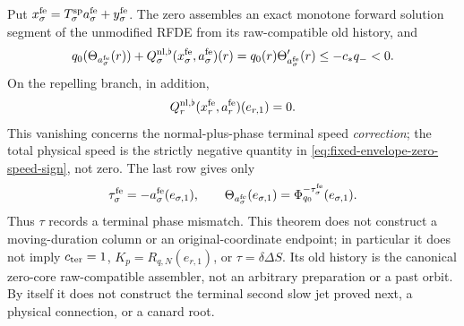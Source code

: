 \begin{theorem}
Put \(x_\sigma^{\rm fe}=T_\sigma^{\rm sp}a_\sigma^{\rm fe}
+y_\sigma^{\rm fe}\).  The zero assembles an exact monotone forward
solution segment of the unmodified RFDE from its raw-compatible old
history, and
\begin{equation}
 q_0(\Theta_{a_\sigma^{\rm fe}}(r))
 +Q_\sigma^{\rm nl,\flat}
       (x_\sigma^{\rm fe},a_\sigma^{\rm fe})(r)
 =q_0(r)\Theta_{a_\sigma^{\rm fe}}'(r)
 \le-c_*q_-<0.                                  \label{eq:fixed-envelope-zero-speed-sign}
\end{equation}
On the repelling branch, in addition,
\begin{equation}
 Q_r^{\rm nl,\flat}(x_r^{\rm fe},a_r^{\rm fe})(e_{r,1})=0.
                                                        \label{eq:fixed-envelope-terminal-speed-correction-zero}
\end{equation}
This vanishing concerns the normal-plus-phase terminal speed
\emph{correction}; the total physical speed is the strictly negative
quantity in \cref{eq:fixed-envelope-zero-speed-sign}, not zero.
The last row gives only
\begin{equation}
 \tau_\sigma^{\rm fe}=-a_\sigma^{\rm fe}(e_{\sigma,1}),
 \qquad
 \Theta_{a_\sigma^{\rm fe}}(e_{\sigma,1})
 =\Phi_{q_0}^{-\tau_\sigma^{\rm fe}}(e_{\sigma,1}).       \label{eq:fixed-envelope-slack-mismatch}
\end{equation}
Thus \(\tau\) records a terminal phase mismatch.  This theorem does not
construct a moving-duration column or an original-coordinate endpoint;
in particular it does not imply \(c_{\rm ter}=1\),
\(K_p=R_{q,N}(e_{r,1})\), or
\(\tau=\delta\Delta S\).  Its old history is the canonical zero-core
raw-compatible assembler, not an arbitrary preparation or a past orbit.
By itself it does not construct the terminal second slow jet proved next,
a physical connection, or a canard root.
\end{theorem}


